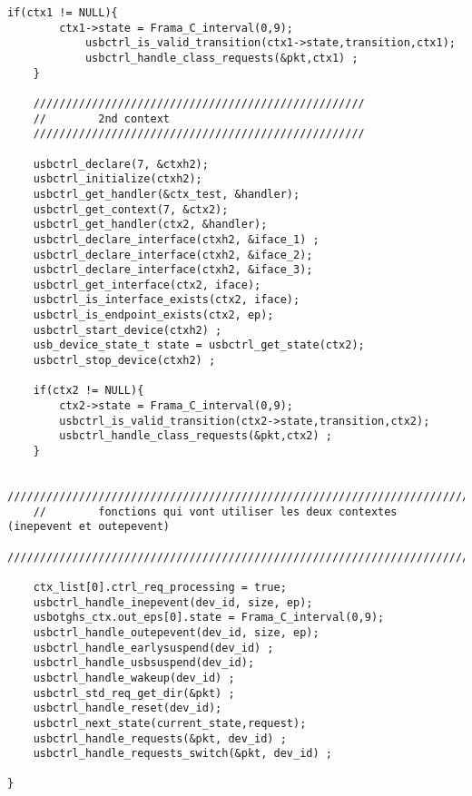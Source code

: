 \begin{lstlisting}[style=CStyle]
    if(ctx1 != NULL){
        ctx1->state = Frama_C_interval(0,9);
            usbctrl_is_valid_transition(ctx1->state,transition,ctx1);
            usbctrl_handle_class_requests(&pkt,ctx1) ;
    }

    ///////////////////////////////////////////////////
    //        2nd context
    ///////////////////////////////////////////////////

    usbctrl_declare(7, &ctxh2);
    usbctrl_initialize(ctxh2);
    usbctrl_get_handler(&ctx_test, &handler);
    usbctrl_get_context(7, &ctx2);
    usbctrl_get_handler(ctx2, &handler);
    usbctrl_declare_interface(ctxh2, &iface_1) ;
    usbctrl_declare_interface(ctxh2, &iface_2);
    usbctrl_declare_interface(ctxh2, &iface_3);
    usbctrl_get_interface(ctx2, iface);
    usbctrl_is_interface_exists(ctx2, iface);
    usbctrl_is_endpoint_exists(ctx2, ep);
    usbctrl_start_device(ctxh2) ;
    usb_device_state_t state = usbctrl_get_state(ctx2);
    usbctrl_stop_device(ctxh2) ;

    if(ctx2 != NULL){
        ctx2->state = Frama_C_interval(0,9);
        usbctrl_is_valid_transition(ctx2->state,transition,ctx2);
        usbctrl_handle_class_requests(&pkt,ctx2) ;
    }

    //////////////////////////////////////////////////////////////////////////////
    //        fonctions qui vont utiliser les deux contextes (inepevent et outepevent)
    //////////////////////////////////////////////////////////////////////////////

    ctx_list[0].ctrl_req_processing = true;
    usbctrl_handle_inepevent(dev_id, size, ep);
    usbotghs_ctx.out_eps[0].state = Frama_C_interval(0,9);
    usbctrl_handle_outepevent(dev_id, size, ep);
    usbctrl_handle_earlysuspend(dev_id) ;
    usbctrl_handle_usbsuspend(dev_id);
    usbctrl_handle_wakeup(dev_id) ;
    usbctrl_std_req_get_dir(&pkt) ;
    usbctrl_handle_reset(dev_id);
    usbctrl_next_state(current_state,request);
	usbctrl_handle_requests(&pkt, dev_id) ;
    usbctrl_handle_requests_switch(&pkt, dev_id) ;

}
\end{lstlisting}


